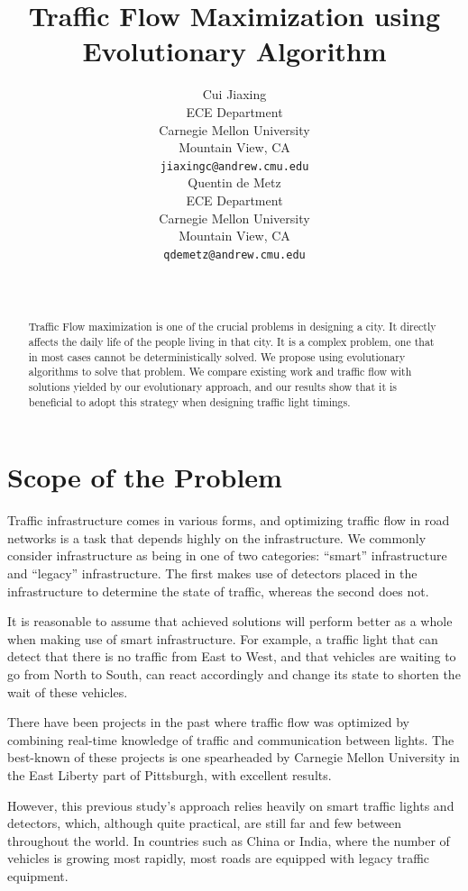 \documentclass{article} %
\title{Traffic Flow Maximization using Evolutionary Algorithm}
\author{
Cui Jiaxing \\
ECE Department\\
Carnegie Mellon University\\
Mountain View, CA \\
\texttt{jiaxingc@andrew.cmu.edu} \\
\And
Quentin de Metz \\
ECE Department \\
Carnegie Mellon University\\
Mountain View, CA \\
\texttt{qdemetz@andrew.cmu.edu} \\
\AND
  \\
\And
  \\
}
\begin{document}
\maketitle

\begin{abstract}
Traffic Flow maximization is one of the crucial problems in designing a city. It directly affects the daily life of the people living in that city. It is a complex problem, one that in most cases cannot be deterministically solved. We propose using evolutionary algorithms to solve that problem. We compare existing work and traffic flow with solutions yielded by our evolutionary approach, and our results show that it is beneficial to adopt this strategy when designing traffic light timings.
\end{abstract}

\section{Scope of the Problem}

Traffic infrastructure comes in various forms, and optimizing traffic flow in road networks is a task that depends highly on the infrastructure. We commonly consider infrastructure as being in one of two categories:  ``smart'' infrastructure and ``legacy'' infrastructure. The first makes use of detectors placed in the infrastructure to determine the state of traffic, whereas the second does not.

It is reasonable to assume that achieved solutions will perform better as a whole when making use of smart infrastructure. For example, a traffic light that can detect that there is no traffic from East to West, and that vehicles are waiting to go from North to South, can react accordingly and change its state to shorten the wait of these vehicles.

There have been projects in the past where traffic flow was optimized by combining real-time knowledge of traffic and communication between lights. The best-known of these projects is one spearheaded by Carnegie Mellon University in the East Liberty part of Pittsburgh, with excellent results.

However, this previous study's approach relies heavily on smart traffic lights and detectors, which, although quite practical, are still far and few between throughout the world. In countries such as China or India, where the number of vehicles is growing most rapidly, most roads are equipped with legacy traffic equipment.
\end{document}
